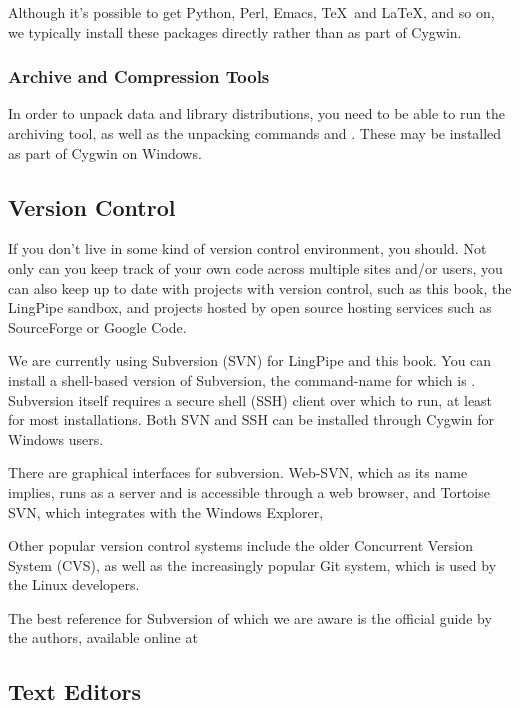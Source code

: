 Although it's possible to get Python, Perl, Emacs, \TeX\ and \LaTeX,
and so on, we typically install these packages directly rather than
as part of Cygwin.

\subsubsection{Archive and Compression Tools}

In order to unpack data and library distributions, you need to be able
to run the  archiving tool, as well as the unpacking commands
 and .  These may be installed as part of
Cygwin on Windows.


\subsection{Version Control}

If you don't live in some kind of version control environment, you should.
Not only can you keep track of your own code across multiple sites and/or
users, you can also keep up to date with projects with version control,
such as this book, the LingPipe sandbox, and projects hosted by open
source hosting services such as SourceForge or Google Code.

We are currently using Subversion (SVN) for LingPipe and this book.
You can install a shell-based version of Subversion, the command-name
for which is .  Subversion itself requires a secure shell
(SSH) client over which to run, at least for most installations.  Both
SVN and SSH can be installed through Cygwin for Windows users.

There are graphical interfaces for subversion.  
Web-SVN, which as its name implies, runs as a server and is
accessible through a web browser, 
%
%
and Tortoise SVN, which integrates with the Windows Explorer,
%

Other popular version control systems include the older Concurrent
Version System (CVS), as well as the increasingly popular Git system,
which is used by the Linux developers.

The best reference for Subversion of which we are aware is the
official guide by the authors, available online at 
%


\subsection{Text Editors}


